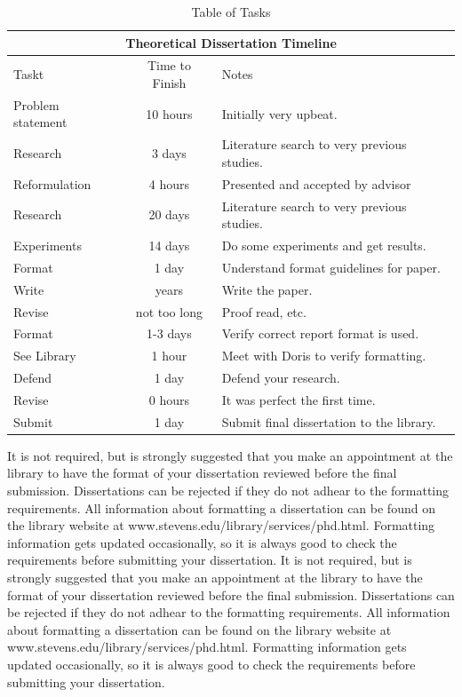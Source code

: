 \documentclass[12pt]{report}
\begin{document}
\begin{table}[htp]

\begin{center}
\begin{tabular}{|l|c|p{3.0in}|}
\hline
\multicolumn{3}{|c|}{Theoretical Dissertation Timeline}\\ \hline
Taskt&Time to Finish&Notes\\ \hline
Problem statement&10 hours&Initially very upbeat.\\ \hline
Research&3 days&Literature search to very previous studies.\\ \hline
Reformulation&4 hours&Presented and accepted by advisor\\ \hline
Research&20 days&Literature search to very previous  studies.\\ \hline
Experiments&14 days&Do some experiments and get results.\\ \hline
Format&1 day&Understand format guidelines for paper.\\ \hline
Write&years&Write the paper.\\ \hline
Revise&not too long&Proof read, etc.\\ \hline
Format&1-3 days&Verify correct report format is used.\\ \hline
See Library&1 hour&Meet with Doris to verify formatting.\\ \hline
Defend&1 day&Defend your research.\\ \hline
Revise&0 hours&It was perfect the first time.\\ \hline
Submit&1 day&Submit final dissertation to the library.\\ \hline
\end{tabular}
\end{center} 

\caption{Table of Tasks}\label{fig:erptsqfit}
\end{table}
It is not required, but is strongly suggested that you make an appointment at the library to have the format of your dissertation reviewed before the final submission.  Dissertations can be rejected if they do not adhear to the formatting requirements.   
All information about formatting a dissertation can be found on the library website at www.stevens.edu/library/services/phd.html.  Formatting information gets updated occasionally, so it is always good to check the requirements before submitting your dissertation.  
It is not required, but is strongly suggested that you make an appointment at the library to have the format of your dissertation reviewed before the final submission.  Dissertations can be rejected if they do not adhear to the formatting requirements.   
All information about formatting a dissertation can be found on the library website at www.stevens.edu/library/services/phd.html.  Formatting information gets updated occasionally, so it is always good to check the requirements before submitting your dissertation.  
\end{document}

